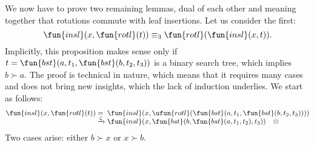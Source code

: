 We now have to prove two remaining lemmas, dual of each other and
meaning together that rotations commute with leaf insertions. Let us
consider the first:
\begin{equation*}
\fun{insl}(x,\fun{rotl}(t)) \equiv_3 \fun{rotl}(\fun{insl}(x,t)).
\end{equation*}
Implicitly, this proposition makes sense only if \(t=\fun{bst}(a, t_1,
\fun{bst}(b,t_2,t_3))\) is a binary search tree, which implies \(b
\succ a\). The proof is technical in nature, which means that it
requires many cases and does not bring new insights, which the lack of
induction underlies. We start as follows:
\begin{equation*}
\begin{array}{@{}r@{\;}l@{\;}l@{}}
  \fun{insl}(x,\fun{rotl}(t))
  & = &
  \fun{insl}(x,\ufun{rotl}(\fun{bst}(a, t_1,\fun{bst}(b,t_2,t_3))))\\
  & \xrightarrow{\smash{\zeta}} &
  \fun{insl}(x,\fun{bst}(b,\fun{bst}(a,t_1,t_2),t_3)) \quad \otimes
\end{array}
\end{equation*}
Two cases arise: either \(b \succ x\) or \(x \succ b\).
